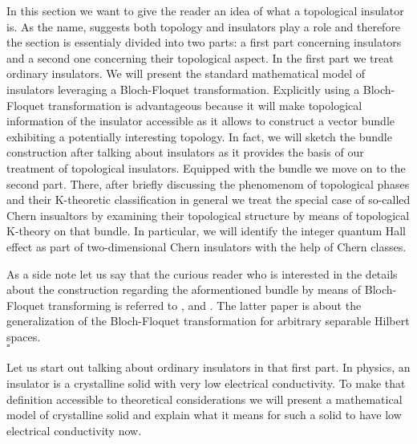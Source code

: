 \nocite{0e533eef}
\nocite{3e24354b}
\nocite{37e40023}
\nocite{5cb8b651}
\nocite{9104a30f}
\nocite{99aba7f6}
\nocite{9fc084b2}
\nocite{c9fb3de7}
\nocite{ce883d84}
\nocite{d02f3620}
\nocite{eda79af1}
\nocite{f94459b0}
\nocite{5914f1ad}
In this section we want to give the reader an idea of what a topological insulator is. As the name, suggests both topology and insulators play a role and therefore the section is essentialy divided into two parts: a first part concerning insulators and a second one concerning their topological aspect. In the first part we treat ordinary insulators. We will present the standard mathematical model of insulators leveraging a Bloch-Floquet transformation. Explicitly using a Bloch-Floquet transformation is advantageous because it will make topological information of the insulator accessible as it allows to construct a vector bundle exhibiting a potentially interesting topology. In fact, we will sketch the bundle construction after talking about insulators as it provides the basis of our treatment of topological insulators. Equipped with the bundle we move on to the second part. There, after briefly discussing the phenomenom of topological phases and their K-theoretic classification in general we treat the special case of so-called Chern insualtors by examining their topological structure by means of topological K-theory on that bundle. In particular, we will identify the integer quantum Hall effect as part of two-dimensional Chern insulators with the help of Chern classes.
\\
\begin{rem}
\label{rem:blochfloquet}
As a side note let us say that the curious reader who is interested in the details about the construction regarding the aformentioned bundle by means of Bloch-Floquet transforming is referred to \cite{9fc084b2}, \cite{d02f3620} and \cite{ce883d84}. The latter paper is about the generalization of the Bloch-Floquet transformation for arbitrary separable Hilbert spaces.
\\
\phantom{proven}
\hfill
$\square$
\\
\end{rem}
Let us start out talking about ordinary insulators in that first part. In physics, an insulator is a crystalline solid with very low electrical conductivity. To make that definition accessible to theoretical considerations we will present a mathematical model of {\glqq}crystalline solid{\grqq} and explain what it means for such a solid to have {\glqq}low electrical conductivity{\grqq} now.
\\
